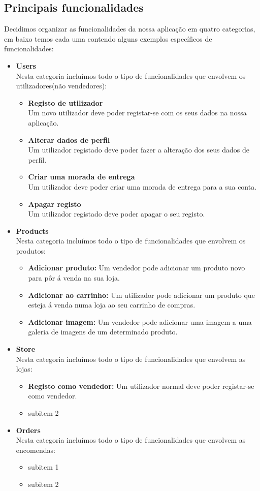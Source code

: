 \subsection{Principais funcionalidades}
Decidimos organizar as funcionalidades da nossa aplicação em quatro categorias, em baixo temos cada uma contendo alguns exemplos específicos de funcionalidades:

\begin{itemize}

  \item \textbf{Users} \\
  Nesta categoria incluímos todo o tipo de funcionalidades que envolvem os utilizadores(não vendedores):
  \begin{itemize}
    \item \textbf{Registo de utilizador}\\ Um novo utilizador deve poder registar-se com os seus dados na nossa aplicação.
    \item \textbf{Alterar dados de perfil}\\ Um utilizador registado deve poder fazer a alteração dos seus dados de perfil.
    \item \textbf{Criar uma morada de entrega}\\ Um utilizador deve poder criar uma morada de entrega para a sua conta.
    \item \textbf{Apagar registo}\\ Um utilizador registado deve poder apagar o seu registo.
  \end{itemize}

  \item \textbf{Products} \\
  Nesta categoria incluímos todo o tipo de funcionalidades que envolvem os produtos:
  \begin{itemize}
      \item \textbf{Adicionar produto:} Um vendedor pode adicionar um produto novo para pôr á venda na sua loja.
      \item \textbf{Adicionar ao carrinho:} Um utilizador pode adicionar um produto que esteja á venda numa loja ao seu carrinho de compras.
      \item \textbf{Adicionar imagem:} Um vendedor pode adicionar uma imagem a uma galeria de imagens de um determinado produto.
  \end{itemize}

  \item \textbf{Store} \\
  Nesta categoria incluímos todo o tipo de funcionalidades que envolvem as lojas:
  \begin{itemize}
    \item \textbf{Registo como vendedor:} Um utilizador normal deve poder registar-se como vendedor.
    \item subitem 2
\end{itemize}

\item \textbf{Orders} \\
Nesta categoria incluímos todo o tipo de funcionalidades que envolvem as encomendas:
\begin{itemize}
  \item subitem 1
  \item subitem 2
\end{itemize}
\end{itemize}